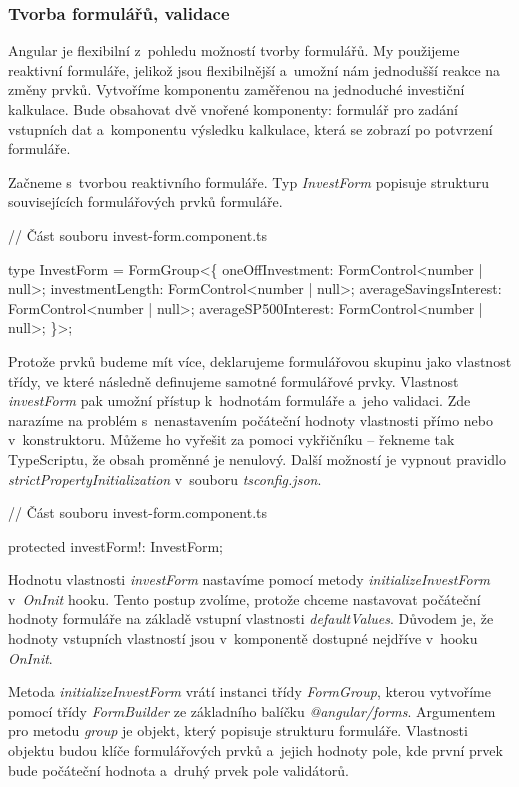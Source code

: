 \subsubsection*{Tvorba formulářů, validace}

Angular je flexibilní z~pohledu možností tvorby formulářů. My použijeme reaktivní formuláře, jelikož jsou flexibilnější a~umožní nám jednodušší reakce na změny prvků.
Vytvoříme komponentu zaměřenou na jednoduché investiční kalkulace. 
Bude obsahovat dvě vnořené komponenty: formulář pro zadání vstupních dat a~komponentu výsledku kalkulace, která se zobrazí po potvrzení formuláře.

Začneme s~tvorbou reaktivního formuláře. Typ \emph{InvestForm} popisuje strukturu souvisejících formulářových prvků formuláře.

\begin{prog}
// Část souboru invest-form.component.ts

type InvestForm = FormGroup<\{
  oneOffInvestment: FormControl<number | null>;
  investmentLength: FormControl<number | null>;
  averageSavingsInterest: FormControl<number | null>;
  averageSP500Interest: FormControl<number | null>;
\}>;
\end{prog}

Protože prvků budeme mít více, deklarujeme formulářovou skupinu jako vlastnost třídy, ve které následně definujeme samotné formulářové prvky. 
Vlastnost \emph{investForm} pak umožní přístup k~hodnotám formuláře a~jeho validaci. Zde narazíme na problém s~nenastavením počáteční hodnoty vlastnosti přímo nebo v~konstruktoru. 
Můžeme ho vyřešit za pomoci vykřičníku -- řekneme tak TypeScriptu, že obsah proměnné je nenulový. Další možností je vypnout pravidlo \emph{strictPropertyInitialization} v~souboru \emph{tsconfig.json}.

\begin{prog}
// Část souboru invest-form.component.ts

protected investForm!: InvestForm;
\end{prog}

Hodnotu vlastnosti \emph{investForm} nastavíme pomocí metody \emph{initializeInvestForm} v~\emph{OnInit} hooku. 
Tento postup zvolíme, protože chceme nastavovat počáteční hodnoty formuláře na základě vstupní vlastnosti \emph{defaultValues}.
Důvodem je, že hodnoty vstupních vlastností jsou v~komponentě dostupné nejdříve v~hooku \emph{OnInit}.

Metoda \emph{initializeInvestForm} vrátí instanci třídy \emph{FormGroup}, kterou vytvoříme pomocí třídy \emph{FormBuilder} ze základního balíčku \emph{@angular/forms}. 
Argumentem pro metodu \emph{group} je objekt, který popisuje strukturu formuláře. 
Vlastnosti objektu budou klíče formulářových prvků a~jejich hodnoty pole, kde první prvek bude počáteční hodnota a~druhý prvek pole validátorů.

